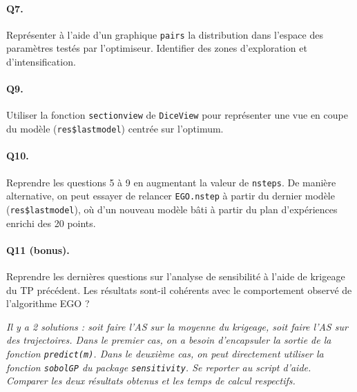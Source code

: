 \documentclass[12pt]{scrartcl}
\begin{document}
\paragraph{Q7. } Représenter à l'aide d'un graphique \texttt{pairs} la distribution dans l'espace des paramètres testés par l'optimiseur. Identifier des zones d'exploration et d'intensification.

\paragraph{Q9. } Utiliser la fonction \texttt{sectionview} de \texttt{DiceView} pour représenter une vue en coupe du modèle (\texttt{res\$lastmodel}) centrée sur l'optimum.

\paragraph{Q10. } Reprendre les questions 5 à 9 en augmentant la valeur de \texttt{nsteps}. De manière alternative, on peut essayer de relancer \texttt{EGO.nstep} à partir du dernier modèle (\texttt{res\$lastmodel}), 
où d'un nouveau modèle bâti à partir du plan d'expériences enrichi des 20 points.

\paragraph{Q11 (bonus). } Reprendre les dernières questions sur l'analyse de sensibilité à l'aide de krigeage du TP précédent. Les résultats sont-il cohérents avec le comportement observé de l'algorithme EGO ?

\textit{Il y a 2 solutions : soit faire l'AS sur la moyenne du krigeage, soit faire l'AS sur des trajectoires.
Dans le premier cas, on a besoin d'encapsuler la sortie de la fonction \texttt{predict(m)}. Dans le deuxième cas, on peut directement utiliser la fonction \texttt{sobolGP} du package \texttt{sensitivity}.
Se reporter au script d'aide. Comparer les deux résultats obtenus et les temps de calcul respectifs.} 

\end{document}
